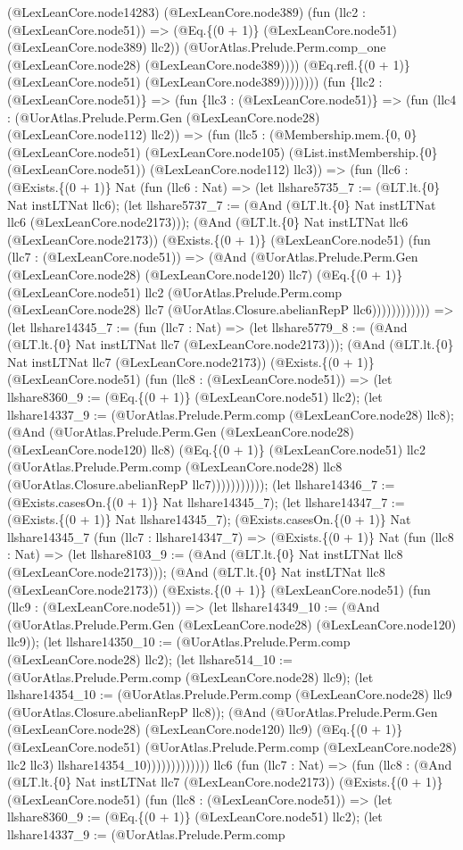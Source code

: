 \documentclass[11pt]{article}
\begin{document}
(@LexLeanCore.node14283) (@LexLeanCore.node389) (fun (llc2 : (@LexLeanCore.node51)) => (@Eq.\{(0 + 1)\} (@LexLeanCore.node51) (@LexLeanCore.node389) llc2)) (@UorAtlas.Prelude.Perm.comp\_one (@LexLeanCore.node28) (@LexLeanCore.node389)))) (@Eq.refl.\{(0 + 1)\} (@LexLeanCore.node51) (@LexLeanCore.node389)))))))) (fun \{llc2 : (@LexLeanCore.node51)\} => (fun \{llc3 : (@LexLeanCore.node51)\} => (fun (llc4 : (@UorAtlas.Prelude.Perm.Gen (@LexLeanCore.node28) (@LexLeanCore.node112) llc2)) => (fun (llc5 : (@Membership.mem.\{0, 0\} (@LexLeanCore.node51) (@LexLeanCore.node105) (@List.instMembership.\{0\} (@LexLeanCore.node51)) (@LexLeanCore.node112) llc3)) => (fun (llc6 : (@Exists.\{(0 + 1)\} Nat (fun (llc6 : Nat) => (let llshare5735\_7 := (@LT.lt.\{0\} Nat instLTNat llc6); (let llshare5737\_7 := (@And (@LT.lt.\{0\} Nat instLTNat llc6 (@LexLeanCore.node2173))); (@And (@LT.lt.\{0\} Nat instLTNat llc6 (@LexLeanCore.node2173)) (@Exists.\{(0 + 1)\} (@LexLeanCore.node51) (fun (llc7 : (@LexLeanCore.node51)) => (@And (@UorAtlas.Prelude.Perm.Gen (@LexLeanCore.node28) (@LexLeanCore.node120) llc7) (@Eq.\{(0 + 1)\} (@LexLeanCore.node51) llc2 (@UorAtlas.Prelude.Perm.comp (@LexLeanCore.node28) llc7 (@UorAtlas.Closure.abelianRepP llc6)))))))))))) => (let llshare14345\_7 := (fun (llc7 : Nat) => (let llshare5779\_8 := (@And (@LT.lt.\{0\} Nat instLTNat llc7 (@LexLeanCore.node2173))); (@And (@LT.lt.\{0\} Nat instLTNat llc7 (@LexLeanCore.node2173)) (@Exists.\{(0 + 1)\} (@LexLeanCore.node51) (fun (llc8 : (@LexLeanCore.node51)) => (let llshare8360\_9 := (@Eq.\{(0 + 1)\} (@LexLeanCore.node51) llc2); (let llshare14337\_9 := (@UorAtlas.Prelude.Perm.comp (@LexLeanCore.node28) llc8); (@And (@UorAtlas.Prelude.Perm.Gen (@LexLeanCore.node28) (@LexLeanCore.node120) llc8) (@Eq.\{(0 + 1)\} (@LexLeanCore.node51) llc2 (@UorAtlas.Prelude.Perm.comp (@LexLeanCore.node28) llc8 (@UorAtlas.Closure.abelianRepP llc7))))))))))); (let llshare14346\_7 := (@Exists.casesOn.\{(0 + 1)\} Nat llshare14345\_7); (let llshare14347\_7 := (@Exists.\{(0 + 1)\} Nat llshare14345\_7); (@Exists.casesOn.\{(0 + 1)\} Nat llshare14345\_7 (fun (llc7 : llshare14347\_7) => (@Exists.\{(0 + 1)\} Nat (fun (llc8 : Nat) => (let llshare8103\_9 := (@And (@LT.lt.\{0\} Nat instLTNat llc8 (@LexLeanCore.node2173))); (@And (@LT.lt.\{0\} Nat instLTNat llc8 (@LexLeanCore.node2173)) (@Exists.\{(0 + 1)\} (@LexLeanCore.node51) (fun (llc9 : (@LexLeanCore.node51)) => (let llshare14349\_10 := (@And (@UorAtlas.Prelude.Perm.Gen (@LexLeanCore.node28) (@LexLeanCore.node120) llc9)); (let llshare14350\_10 := (@UorAtlas.Prelude.Perm.comp (@LexLeanCore.node28) llc2); (let llshare514\_10 := (@UorAtlas.Prelude.Perm.comp (@LexLeanCore.node28) llc9); (let llshare14354\_10 := (@UorAtlas.Prelude.Perm.comp (@LexLeanCore.node28) llc9 (@UorAtlas.Closure.abelianRepP llc8)); (@And (@UorAtlas.Prelude.Perm.Gen (@LexLeanCore.node28) (@LexLeanCore.node120) llc9) (@Eq.\{(0 + 1)\} (@LexLeanCore.node51) (@UorAtlas.Prelude.Perm.comp (@LexLeanCore.node28) llc2 llc3) llshare14354\_10))))))))))))) llc6 (fun (llc7 : Nat) => (fun (llc8 : (@And (@LT.lt.\{0\} Nat instLTNat llc7 (@LexLeanCore.node2173)) (@Exists.\{(0 + 1)\} (@LexLeanCore.node51) (fun (llc8 : (@LexLeanCore.node51)) => (let llshare8360\_9 := (@Eq.\{(0 + 1)\} (@LexLeanCore.node51) llc2); (let llshare14337\_9 := (@UorAtlas.Prelude.Perm.comp 
\end{document}
